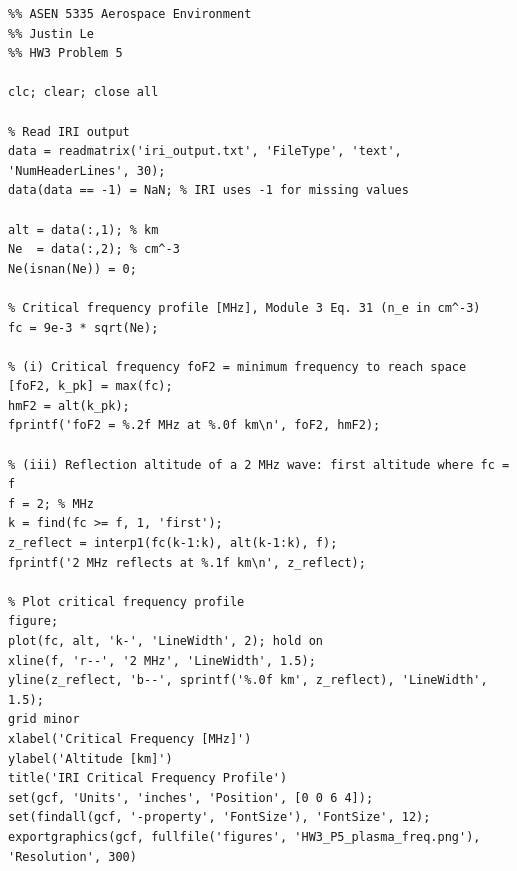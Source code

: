 \documentclass[11pt]{article}
\begin{document}
\newpage
\begin{lstlisting}
%% ASEN 5335 Aerospace Environment
%% Justin Le
%% HW3 Problem 5

clc; clear; close all

% Read IRI output
data = readmatrix('iri_output.txt', 'FileType', 'text', 'NumHeaderLines', 30);
data(data == -1) = NaN; % IRI uses -1 for missing values

alt = data(:,1); % km
Ne  = data(:,2); % cm^-3
Ne(isnan(Ne)) = 0;

% Critical frequency profile [MHz], Module 3 Eq. 31 (n_e in cm^-3)
fc = 9e-3 * sqrt(Ne);

% (i) Critical frequency foF2 = minimum frequency to reach space
[foF2, k_pk] = max(fc);
hmF2 = alt(k_pk);
fprintf('foF2 = %.2f MHz at %.0f km\n', foF2, hmF2);

% (iii) Reflection altitude of a 2 MHz wave: first altitude where fc = f
f = 2; % MHz
k = find(fc >= f, 1, 'first');
z_reflect = interp1(fc(k-1:k), alt(k-1:k), f);
fprintf('2 MHz reflects at %.1f km\n', z_reflect);

% Plot critical frequency profile
figure;
plot(fc, alt, 'k-', 'LineWidth', 2); hold on
xline(f, 'r--', '2 MHz', 'LineWidth', 1.5);
yline(z_reflect, 'b--', sprintf('%.0f km', z_reflect), 'LineWidth', 1.5);
grid minor
xlabel('Critical Frequency [MHz]')
ylabel('Altitude [km]')
title('IRI Critical Frequency Profile')
set(gcf, 'Units', 'inches', 'Position', [0 0 6 4]);
set(findall(gcf, '-property', 'FontSize'), 'FontSize', 12);
exportgraphics(gcf, fullfile('figures', 'HW3_P5_plasma_freq.png'), 'Resolution', 300)
\end{lstlisting}
\end{document}
